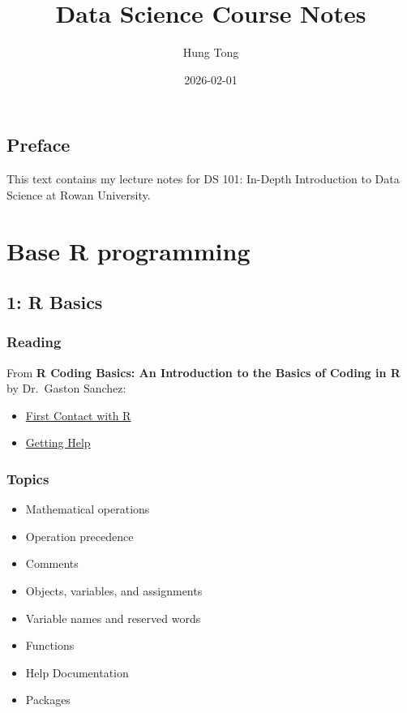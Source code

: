 \documentclass[
  letterpaper,
  DIV=11,
  numbers=noendperiod]{scrreprt}
\title{Data Science Course Notes}
\author{Hung Tong}
\date{2026-02-01}
\renewcommand*\contentsname{Table of contents}
\newcommand\contentsname{Table of contents}
\begin{document}
\maketitle

\renewcommand*\contentsname{Table of contents}
{
\hypersetup{linkcolor=}
\setcounter{tocdepth}{2}
\tableofcontents
}


\chapter*{Preface}\label{preface}


This text contains my lecture notes for DS 101: In-Depth Introduction to
Data Science at Rowan University.

\part{Base R programming}

\chapter{1: R Basics}\label{r-basics}

\section{Reading}\label{reading}

From \textbf{R Coding Basics: An Introduction to the Basics of Coding in
R} by Dr.~Gaston Sanchez:

\begin{itemize}
\item
  \href{https://www.gastonsanchez.com/R-ice-breaker/1-04-first-contact.html}{First
  Contact with R}
\item
  \href{https://www.gastonsanchez.com/R-ice-breaker/1-05-help-documentation.html}{Getting
  Help}
\end{itemize}

\section{Topics}\label{topics}

\begin{itemize}
\item
  Mathematical operations
\item
  Operation precedence
\item
  Comments
\item
  Objects, variables, and assignments
\item
  Variable names and reserved words
\item
  Functions
\item
  Help Documentation
\item
  Packages
\end{itemize}
\end{document}

